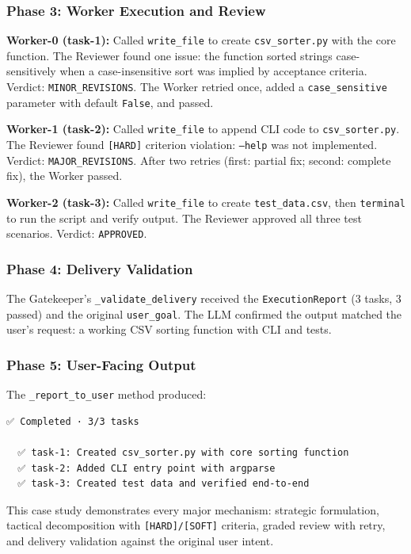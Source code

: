 \documentclass[11pt,a4paper]{article}
\begin{document}
\subsubsection*{Phase 3: Worker Execution and Review}

\textbf{Worker-0 (task-1):} Called \texttt{write\_file} to create
\texttt{csv\_sorter.py} with the core function. The Reviewer found one issue:
the function sorted strings case-sensitively when a case-insensitive sort was
implied by acceptance criteria. Verdict: \texttt{MINOR\_REVISIONS}. The Worker
retried once, added a \texttt{case\_sensitive} parameter with default
\texttt{False}, and passed.

\textbf{Worker-1 (task-2):} Called \texttt{write\_file} to append CLI code
to \texttt{csv\_sorter.py}. The Reviewer found \texttt{[HARD]} criterion
violation: \texttt{--help} was not implemented. Verdict:
\texttt{MAJOR\_REVISIONS}. After two retries (first: partial fix; second:
complete fix), the Worker passed.

\textbf{Worker-2 (task-3):} Called \texttt{write\_file} to create
\texttt{test\_data.csv}, then \texttt{terminal} to run the script and verify
output. The Reviewer approved all three test scenarios. Verdict:
\texttt{APPROVED}.

\subsubsection*{Phase 4: Delivery Validation}

The Gatekeeper's \texttt{\_validate\_delivery} received the
\texttt{ExecutionReport} (3 tasks, 3 passed) and the original
\texttt{user\_goal}. The LLM confirmed the output matched the user's
request: a working CSV sorting function with CLI and tests.

\subsubsection*{Phase 5: User-Facing Output}

The \texttt{\_report\_to\_user} method produced:

\begin{verbatim}
✅ Completed · 3/3 tasks

  ✅ task-1: Created csv_sorter.py with core sorting function
  ✅ task-2: Added CLI entry point with argparse
  ✅ task-3: Created test data and verified end-to-end
\end{verbatim}

This case study demonstrates every major mechanism: strategic formulation,
tactical decomposition with \texttt{[HARD]/[SOFT]} criteria, graded review
with retry, and delivery validation against the original user intent.
\end{document}
